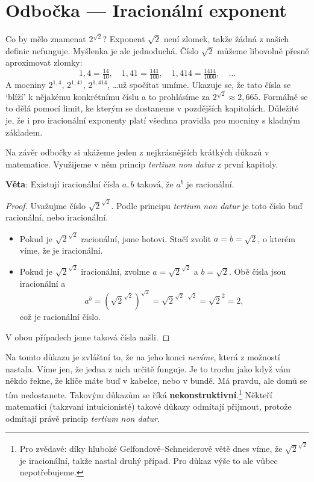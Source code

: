 \section{Odbočka --- Iracionální exponent}

Co by mělo znamenat $2^{\sqrt{2}}$? Exponent $\sqrt{2}$ není zlomek, takže žádná z našich definic nefunguje. Myšlenka je ale jednoduchá. Číslo $\sqrt{2}$ můžeme libovolně přesně aproximovat zlomky:
\begin{equation*}
  1{,}4 = \tfrac{14}{10},\quad 1{,}41 = \tfrac{141}{100},\quad 1{,}414 = \tfrac{1414}{1000},\quad \ldots
\end{equation*}
A mocniny $2^{1{,}4}$, $2^{1{,}41}$, $2^{1{,}414}$, \ldots už spočítat umíme. Ukazuje se, že tato čísla se `blíží' k nějakému konkrétnímu číslu a to prohlásíme za $2^{\sqrt{2}}\approx 2{,}665$. Formálně se to dělá pomocí limit, ke kterým se dostaneme v pozdějších kapitolách. Důležité je, že i pro iracionální exponenty platí všechna pravidla pro mocniny s kladným základem.

Na závěr odbočky si ukážeme jeden z nejkrásnějších krátkých důkazů v matematice. Využijeme v něm princip \textit{tertium non datur} z první kapitoly.

\begin{definitionbox}
  \textbf{Věta}: Existují iracionální čísla $a, b$ taková, že $a^b$ je racionální.
\end{definitionbox}

\begin{proof}
  Uvažujme číslo $\sqrt{2}^{\sqrt{2}}$. Podle principu \textit{tertium non datur} je toto číslo buď racionální, nebo iracionální.
  \begin{itemize}
    \item Pokud je $\sqrt{2}^{\sqrt{2}}$ racionální, jsme hotovi. Stačí zvolit $a = b = \sqrt{2}$, o kterém víme, že je iracionální.
    \item Pokud je $\sqrt{2}^{\sqrt{2}}$ iracionální, zvolme $a = \sqrt{2}^{\sqrt{2}}$ a $b = \sqrt{2}$. Obě čísla jsou iracionální a
    \begin{equation*}
      a^b = {\left(\sqrt{2}^{\sqrt{2}}\right)}^{\sqrt{2}} = \sqrt{2}^{\sqrt{2}\cdot\sqrt{2}} = \sqrt{2}^2 = 2,
    \end{equation*}
    což je racionální číslo.
  \end{itemize}
  V obou případech jsme taková čísla našli.
\end{proof}

Na tomto důkazu je zvláštní to, že na jeho konci \textit{nevíme}, která z možností nastala. Víme jen, že jedna z nich určitě funguje. Je to trochu jako když vám někdo řekne, že klíče máte buď v kabelce, nebo v bundě. Má pravdu, ale domů se tím nedostanete. Takovým důkazům se říká \textbf{nekonstruktivní}.\footnote{Pro zvědavé: díky hluboké Gelfondově--Schneiderově větě dnes víme, že $\sqrt{2}^{\sqrt{2}}$ je iracionální, takže nastal druhý případ. Pro důkaz výše to ale vůbec nepotřebujeme.} Někteří matematici (takzvaní intuicionisté) takové důkazy odmítají přijmout, protože odmítají právě princip \textit{tertium non datur}.

